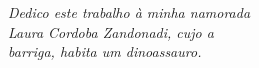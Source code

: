 
\begin{dedicatoria}
    \vspace*{\fill}    
    \begin{flushright}
        \noindent
        \textit{ Dedico este trabalho à minha namorada\\Laura Cordoba Zandonadi, cujo a\\barriga, habita um dinoassauro.}\vspace*{2cm}
    \end{flushright}
\end{dedicatoria}